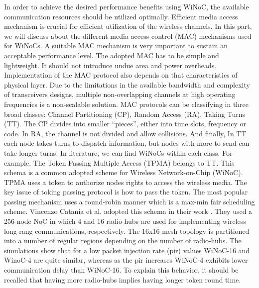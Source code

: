 \documentclass[12pt]{article}
\begin{document}
In order to achieve the desired performance benefits using WiNoC, the available communication resources should be utilized optimally. Efficient media access mechanism is crucial for efficient utilization of the wireless channels. In this part, we will discuss about the different media access control (MAC) mechanisms used for WiNoCs.
A suitable MAC mechanism is very important to sustain an acceptable performance level. The adopted MAC has to be simple and lightweight. It should not introduce undue area and power overheads. Implementation of the MAC protocol also depends on that characteristics of physical layer. Due to the limitations in the available bandwidth and complexity of transceivers designs, multiple non-overlapping channels at high operating frequencies is a non-scalable solution. 
MAC protocols can be classifying in three broad classes: Channel Partitioning (CP), Random Access (RA), Taking Turns (TT). The CP divides into smaller “pieces”, either into time slots, frequency or code. In RA, the channel is not divided and allow collisions. And finally, In TT each node takes turns to dispatch information, but nodes with more to send can take longer turns.
In literature, we can find WiNoCs within each class. For example, The Token Passing Multiple Access (TPMA) belongs to TT. This schema is a common adopted scheme for Wireless Network-on-Chip (WiNoC). TPMA uses a token to authorize nodes rights to access the wireless media. The key issue of toking passing protocol is how to pass the token. The most popular passing mechanism uses a round-robin manner which is a max-min fair scheduling scheme.
Vincenzo Catania et al. adopted this schema in their work \citep{7459514}. They used a 256-node NoC in which 4 and 16 radio-hubs are used for implementing wireless long-rang communications, respectively. The 16x16 mesh topology is partitioned into a number of regular regions depending on the number of radio-hubs. The simulations show that for a low packet injection rate (pir) values WiNoC-16 and WinoC-4 are quite similar, whereas as the pir increases WiNoC-4 exhibits lower communication delay than WiNoC-16. To explain this behavior, it should be recalled that having more radio-hubs implies having longer token round time. 
\end{document}
